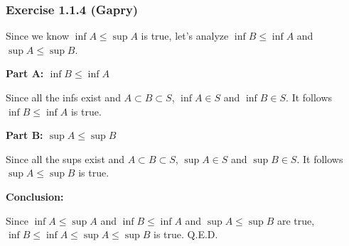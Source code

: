 \subsubsection*{Exercise 1.1.4 (Gapry)}

\begin{flushleft}
Since we know $\inf A \le \sup A$ is true, let's analyze $\inf B \le \inf A$ and $\sup A \le \sup B$.

\textbf{Part A: $\inf B \le \inf A$}

Since all the infs exist and $A \subset B \subset S$, $\inf A \in S$ and $\inf B \in S$. It follows $\inf B \le \inf A$ is true.

\textbf{Part B: $\sup A \le \sup B$}

Since all the sups exist and $A \subset B \subset S$, $\sup A \in S$ and $\sup B \in S$. It follows $\sup A \le \sup B$ is true.

\textbf{Conclusion:}

Since $\inf A \le \sup A$ and $\inf B \le \inf A$ and $\sup A \le \sup B$ are true, 
$\inf B \le \inf A \le \sup A \le \sup B$ is true. Q.E.D.

\end{flushleft}
